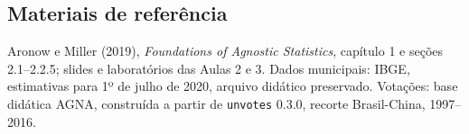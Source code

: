 \documentclass[
  brazilian,
  11pt,
  a4paper]{article}
\begin{document}
\subsection{Materiais de referência}\label{materiais-de-referuxeancia}

Aronow e Miller (2019), \emph{Foundations of Agnostic Statistics},
capítulo 1 e seções 2.1--2.2.5; slides e laboratórios das Aulas 2 e 3.
Dados municipais: IBGE, estimativas para 1º de julho de 2020, arquivo
didático preservado. Votações: base didática AGNA, construída a partir
de \texttt{unvotes} 0.3.0, recorte Brasil-China, 1997--2016.
\end{document}
